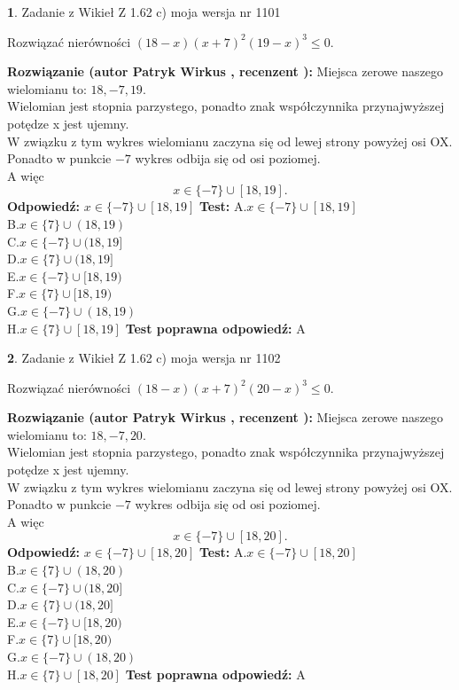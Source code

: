 \documentclass[12pt, a4paper]{article}
\theoremstyle{definition} %
\newtheorem{zad}{}
\newcommand{\zadStart}[1]{\begin{zad}#1\newline}
\newcommand{\zadStop}{\end{zad}}
\newcommand{\rozwStart}[2]{\noindent \textbf{Rozwiązanie (autor #1 , recenzent #2): }\newline}
\newcommand{\rozwStop}{\newline}
\newcommand{\odpStart}{\noindent \textbf{Odpowiedź:}\newline}
\newcommand{\odpStop}{\newline}
\newcommand{\testStart}{\noindent \textbf{Test:}\newline}
\newcommand{\testStop}{\newline}
\newcommand{\kluczStart}{\noindent \textbf{Test poprawna odpowiedź:}\newline}
\newcommand{\kluczStop}{\newline}
\begin{document}
\zadStart{Zadanie z Wikieł Z 1.62 c) moja wersja nr 1101}

Rozwiązać nierówności $(18-x)(x+7)^{2}(19-x)^{3}\le0$.
\zadStop
\rozwStart{Patryk Wirkus}{}
Miejsca zerowe naszego wielomianu to: $18, -7, 19$.\\
Wielomian jest stopnia parzystego, ponadto znak współczynnika przy\linebreak najwyższej potędze x jest ujemny.\\ W związku z tym wykres wielomianu zaczyna się od lewej strony powyżej osi OX.\\
Ponadto w punkcie $-7$ wykres odbija się od osi poziomej.\\
A więc $$x \in \{-7\} \cup [18,19].$$
\rozwStop
\odpStart
$x \in \{-7\} \cup [18,19]$
\odpStop
\testStart
A.$x \in \{-7\} \cup [18,19]$\\
B.$x \in \{7\} \cup (18,19)$\\
C.$x \in \{-7\} \cup (18,19]$\\
D.$x \in \{7\} \cup (18,19]$\\
E.$x \in \{-7\} \cup [18,19)$\\
F.$x \in \{7\} \cup [18,19)$\\
G.$x \in \{-7\} \cup (18,19)$\\
H.$x \in \{7\} \cup [18,19]$
\testStop
\kluczStart
A
\kluczStop



\zadStart{Zadanie z Wikieł Z 1.62 c) moja wersja nr 1102}

Rozwiązać nierówności $(18-x)(x+7)^{2}(20-x)^{3}\le0$.
\zadStop
\rozwStart{Patryk Wirkus}{}
Miejsca zerowe naszego wielomianu to: $18, -7, 20$.\\
Wielomian jest stopnia parzystego, ponadto znak współczynnika przy\linebreak najwyższej potędze x jest ujemny.\\ W związku z tym wykres wielomianu zaczyna się od lewej strony powyżej osi OX.\\
Ponadto w punkcie $-7$ wykres odbija się od osi poziomej.\\
A więc $$x \in \{-7\} \cup [18,20].$$
\rozwStop
\odpStart
$x \in \{-7\} \cup [18,20]$
\odpStop
\testStart
A.$x \in \{-7\} \cup [18,20]$\\
B.$x \in \{7\} \cup (18,20)$\\
C.$x \in \{-7\} \cup (18,20]$\\
D.$x \in \{7\} \cup (18,20]$\\
E.$x \in \{-7\} \cup [18,20)$\\
F.$x \in \{7\} \cup [18,20)$\\
G.$x \in \{-7\} \cup (18,20)$\\
H.$x \in \{7\} \cup [18,20]$
\testStop
\kluczStart
A
\kluczStop
\end{document}
